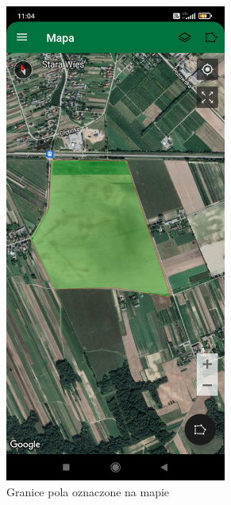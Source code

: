 \documentclass[a4paper,12pt,oneside]{book}
\begin{document}
	\begin{figure}[H]
		\centering
		\begin{subfigure}{.5\textwidth}
			\centering
			\includegraphics[width=0.8\textwidth]{grafika/nawigator_1.jpg}
			\caption{Granice pola oznaczone na mapie}
		\end{subfigure}%
		\begin{subfigure}{.5\textwidth}
			\centering

\end{subfigure}
\end{figure}
\end{document}
